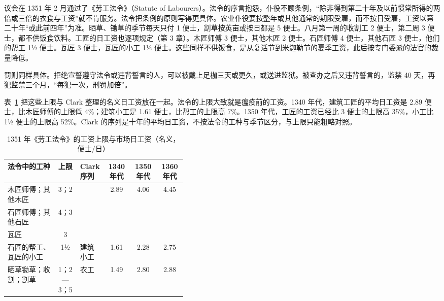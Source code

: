 议会在 1351 年 2 月通过了《劳工法令》（Statute of Labourers）\cite{sotr1810}。法令的序言抱怨，仆役不顾条例，“除非得到第二十年及以前惯常所得的两倍或三倍的衣食与工资”就不肯服务。法令把条例的原则写得更具体。农业仆役要按整年或其他通常的期限受雇，而不按日受雇，工资以第二十年“或此前四年”为准。晒草、锄草的季节每天只付 1 便士，割草按英亩或按日都是 5 便士。八月第一周的收割工 2 便士，第二周 3 便士，都不供饭食饮料。工匠的日工资也逐项规定（第 3 章）。木匠师傅 3 便士，其他木匠 2 便士。石匠师傅 4 便士，其他石匠 3 便士，他们的帮工 1½ 便士。瓦匠 3 便士，瓦匠的小工 1½ 便士。这些同样不供饭食，是从复活节到米迦勒节的夏季工资，此后按专门委派的法官的裁量降低。

罚则同样具体。拒绝宣誓遵守法令或违背誓言的人，可以被戴上足枷三天或更久，或送进监狱。被查办之后又违背誓言的，监禁 40 天，再犯监禁三个月，“每犯一次，刑罚加倍”\cite{sotr1810}。

表~\ref{tab:medieval-statute} 把这些上限与 Clark 整理的名义日工资放在一起。法令的上限大致就是瘟疫前的工资。1340 年代，建筑工匠的平均日工资是 2.89 便士，比木匠师傅的上限低 4\%；建筑小工是 1.61 便士，比帮工的上限高 7\%。1350 年代，工匠的工资已经比 3 便士的上限高 35\%，小工比 1½ 便士的上限高 52\%。Clark 的序列是十年的平均日工资，不按法令的工种与季节区分，与上限只能粗略对照。

\begin{table}[htbp]\centering\small
\caption{1351 年《劳工法令》的工资上限与市场日工资（名义，便士/日）}\label{tab:medieval-statute}
\begin{tabularx}{\linewidth}{@{}>{\raggedright\arraybackslash}p{0.29\linewidth} c >{\raggedright\arraybackslash}p{0.12\linewidth} c c c@{}}
\toprule
法令中的工种 & 上限 & Clark 序列 & 1340 年代 & 1350 年代 & 1360 年代 \\\midrule
木匠师傅；其他木匠 & 3；2 & \multirow{3}{=}{建筑工匠} & \multirow{3}{*}{2.89} & \multirow{3}{*}{4.06} & \multirow{3}{*}{4.45} \\
石匠师傅；其他石匠 & 4；3 & & & & \\
瓦匠 & 3 & & & & \\
石匠的帮工、瓦匠的小工 & 1½ & 建筑小工 & 1.61 & 2.28 & 2.75 \\
晒草锄草；收割；割草 & 1；2—3；5 & 农工 & 1.49 & 2.80 & 2.88 \\
\bottomrule
\end{tabularx}
\end{table}

